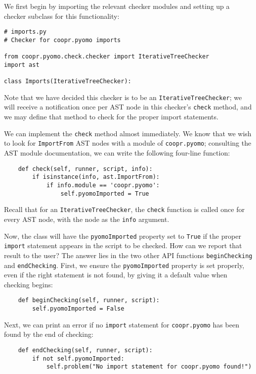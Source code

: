 \documentclass{article}
\begin{document}
We first begin by importing the relevant checker modules and setting up a checker subclass for this functionality:

\begin{verbatim}
# imports.py
# Checker for coopr.pyomo imports

from coopr.pyomo.check.checker import IterativeTreeChecker
import ast

class Imports(IterativeTreeChecker):
\end{verbatim}

\noindent Note that we have decided this checker is to be an \verb!IterativeTreeChecker!; we will receive a notification once per AST node in this checker's \verb!check! method, and we may define that method to check for the proper import statements.

We can implement the \verb!check! method almost immediately. We know that we wish to look for \verb!ImportFrom! AST nodes with a module of \verb!coopr.pyomo!; consulting the AST module documentation, we can write the following four-line function:

\begin{verbatim}
    def check(self, runner, script, info):
        if isinstance(info, ast.ImportFrom):
            if info.module == 'coopr.pyomo':
                self.pyomoImported = True
\end{verbatim}

\noindent Recall that for an \verb!IterativeTreeChecker!, the \verb!check! function is called once for every AST node, with the node as the \verb!info! argument.

Now, the class will have the \verb!pyomoImported! property set to \verb!True! if the proper \verb!import! statement appears in the script to be checked. How can we report that result to the user? The answer lies in the two other API functions \verb!beginChecking! and \verb!endChecking!. First, we ensure the \verb!pyomoImported! property is set properly, even if the right statement is not found, by giving it a default value when checking begins:

\begin{verbatim}
    def beginChecking(self, runner, script):
        self.pyomoImported = False
\end{verbatim}

Next, we can print an error if no \verb!import! statement for \verb!coopr.pyomo! has been found by the end of checking:

\begin{verbatim}
    def endChecking(self, runner, script):
        if not self.pyomoImported:
            self.problem("No import statement for coopr.pyomo found!")
\end{verbatim}
\end{document}
